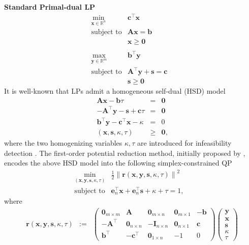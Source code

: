 \documentclass{article}
\newcommand{\assign}{:=}
\newcommand{\tmstrong}[1]{\textbf{#1}}
\newcommand{\x}{\mathbf{x}}
\newcommand{\A}{\mathbf{A}}
\newcommand{\0}{\textbf{0}}
\newcommand{\e}{\mathbf{e}}
\newcommand{\I}{\mathbf{I}}
\newcommand{\tmb}{\mathbf{b}}
\newcommand{\tmc}{\mathbf{c}}
\newcommand{\y}{\mathbf{y}}
\newcommand{\s}{\mathbf{s}}
\newcommand{\tmr}{\mathbf{r}}
\begin{document}
{\tmstrong{Standard Primal-dual LP}}
\begin{eqnarray*}
  \min_{\x \in \mathbb{R}^n} & \tmc^{\top} \x & \\
  \text{subject to} & \A \x = \tmb & \\
  & \x \geq \0 & \\
  &  & \\
  \max_{\y \in \mathbb{R}^m} & \tmb^{\top} \y & \\
  \text{subject to} & \A^{\top} \y + \s = \tmc & \\
  & \s \geq \0 & 
\end{eqnarray*}
It is well-known that LPs admit a homogeneous self-dual (HSD) model
\begin{eqnarray*}
  \A \x - \tmb \tau & = & \0\\
  - \A^{\top} \y - \s + \tmc \tau & = & \0\\
  \tmb^{\top} \y - \tmc^{\top} \x - \kappa & = & 0\\
  \left( \x, \s, \kappa, \tau \right) & \geq & \0,
\end{eqnarray*}
where the two homogenizing variables $\kappa, \tau$ are introduced for
infeasibility detection {\cite{ye2011interior}}. The first-order potential
reduction method, initially proposed by {\cite{ye2015first}}, encodes the
above HSD model into the following simplex-constrained QP
\begin{eqnarray*}
  \min_{\left( \x, \y, \s, \kappa, \tau \right)} & \frac{1}{2} \left\| \tmr
  \left( \x, \y, \s, \kappa, \tau \right) \right\|^2 & \\
  \text{subject to} & \e_n^{\top} \x + \e_n^{\top} \s + \kappa + \tau = 1, & 
\end{eqnarray*}
where
\begin{eqnarray*}
  \tmr \left( \x, \y, \s, \kappa, \tau \right) & \assign &
  \left(\begin{array}{ccccc}
    \0_{m \times m} & \A & \0_{m \times n} & \0_{m \times 1} & - \tmb\\
    - \A^{\top} & \0_{n \times n} & - \I_{n \times n} & \0_{n \times 1} &
    \tmc\\
    \tmb^{\top} & - \tmc^{\top} & \0_{1 \times n} & - 1 & 0
  \end{array}\right) \left(\begin{array}{c}
    \y\\
    \x\\
    \s\\
    \kappa\\
    \tau
  \end{array}\right)
\end{eqnarray*}
\end{document}

